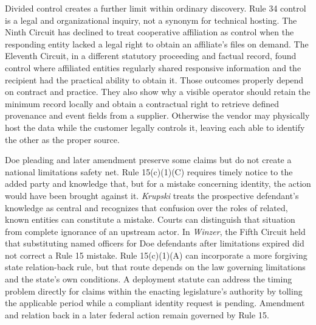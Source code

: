 Divided control creates a further limit within ordinary discovery. Rule 34 control is a legal and organizational inquiry, not a synonym for technical hosting. The Ninth Circuit has declined to treat cooperative affiliation as control when the responding entity lacked a legal right to obtain an affiliate's files on demand. The Eleventh Circuit, in a different statutory proceeding and factual record, found control where affiliated entities regularly shared responsive information and the recipient had the practical ability to obtain it. Those outcomes properly depend on contract and practice. They also show why a visible operator should retain the minimum record locally and obtain a contractual right to retrieve defined provenance and event fields from a supplier. Otherwise the vendor may physically host the data while the customer legally controls it, leaving each able to identify the other as the proper source.

Doe pleading and later amendment preserve some claims but do not create a national limitations safety net. Rule 15(c)(1)(C) requires timely notice to the added party and knowledge that, but for a mistake concerning identity, the action would have been brought against it. \emph{Krupski} treats the prospective defendant's knowledge as central and recognizes that confusion over the roles of related, known entities can constitute a mistake. Courts can distinguish that situation from complete ignorance of an upstream actor. In \emph{Winzer}, the Fifth Circuit held that substituting named officers for Doe defendants after limitations expired did not correct a Rule 15 mistake. Rule 15(c)(1)(A) can incorporate a more forgiving state relation-back rule, but that route depends on the law governing limitations and the state's own conditions. A deployment statute can address the timing problem directly for claims within the enacting legislature's authority by tolling the applicable period while a compliant identity request is pending. Amendment and relation back in a later federal action remain governed by Rule 15.

